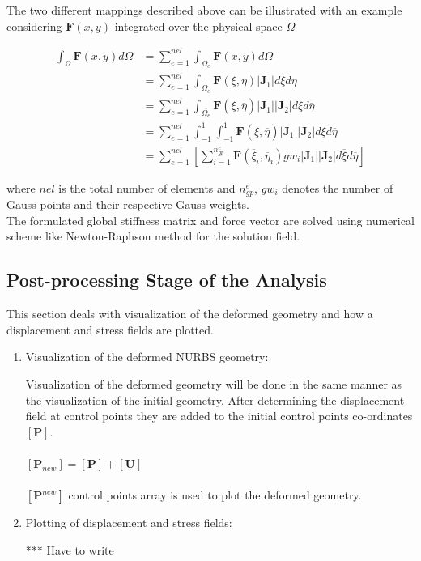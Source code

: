 \documentclass[12pt]{article}
\begin{document}
The two different mappings described above can be illustrated with an example considering $ \textbf{F}(x,y)$ integrated over the physical space $\Omega$

\begin{equation*}
\begin{split}
\int_{\Omega} \textbf{F}(x,y)d\Omega & = \sum_{e=1}^{nel} \int_{\Omega_e} \textbf{F}(x,y) d\Omega  \\
& = \sum_{e=1}^{nel} \int_{\widetilde{\Omega_e}} \textbf{F}(\xi,\eta)|\textbf{J}_1| d\xi d\eta \\
& = \sum_{e=1}^{nel} \int_{\overline{\Omega_e}} \textbf{F}(\overline\xi,\overline\eta)|\textbf{J}_1||\textbf{J}_2| d\overline\xi d\overline\eta  \\
& = \sum_{e=1}^{nel} \int_{-1}^{1} \int_{-1}^{1} \textbf{F}(\overline\xi,\overline\eta)|\textbf{J}_1||\textbf{J}_2| d\overline\xi d\overline\eta  \\
& = \sum_{e=1}^{nel} \left[ \sum_{i=1}^{n_{gp}^e} \textbf{F}(\overline\xi_i,\overline\eta_i) gw_i |\textbf{J}_1||\textbf{J}_2| d\overline\xi d\overline\eta \right]
\end{split}
\end{equation*}

\noindent
where $nel$ is the total number of elements and $n_{gp}^e$, $gw_i$ denotes the number of Gauss points and their respective Gauss weights.\\
\noindent
The formulated global stiffness matrix and force vector are solved using numerical scheme like Newton-Raphson method for the solution field.

\subsection{Post-processing Stage of the Analysis}
This section deals with visualization of the deformed geometry and how a displacement and stress fields are plotted. 

\begin{enumerate}[leftmargin=*]
	\item Visualization of the deformed NURBS geometry:
	
	Visualization of the deformed geometry will be done in the same manner as the visualization of the initial geometry. After determining the displacement field at control points they are added to the initial control points co-ordinates $[\textbf{P}]$.\\
	\\
	$[\textbf{P}_{new}]=[\textbf{P}]+[\textbf{U}]$ \\
	\\
	$[\textbf{P}^{new}]$ control points array is used to plot the deformed geometry.
	
	\item Plotting of displacement and stress fields:
	
	*** Have to write
\end{enumerate}
\end{document}
